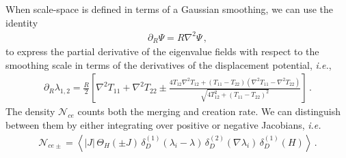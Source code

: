 \documentclass[a4paper, 11pt]{article}
\begin{document}
When scale-space is defined in terms of a Gaussian smoothing, we can use the identity
\begin{align}
\partial_R \Psi = R \nabla^2 \Psi\,,
\end{align}
to express the partial derivative of the eigenvalue fields with respect to the smoothing scale in terms of the derivatives of the displacement potential, \textit{i.e.},
\begin{align}
\partial_R \lambda_{1,2} = \frac{R}{2}\left[ \nabla^2 T_{11} + \nabla^2 T_{22} \pm \frac{4 T_{12} \nabla^2 T_{12} + (T_{11} - T_{22})(\nabla^2T_{11} - \nabla^2 T_{22})}{\sqrt{4T_{12}^2 + (T_{11}-T_{22})^2}}\right]\,.
\end{align}
The density $\mathcal{N}_{ce}$ counts both the merging and creation rate. We can distinguish between them by either integrating over positive or negative Jacobians, \textit{i.e.}
\begin{align}
\mathcal{N}_{ce \pm } = 
\left\langle \left|J\right| \,
\Theta_H(\pm J)\,
\delta_D^{(1)}(\lambda_i-\lambda)\,
 \delta_D^{(2)}(\nabla \lambda_i)\,
  \delta_D^{(1)}(H)
\right\rangle\,.
\end{align}
\end{document}
